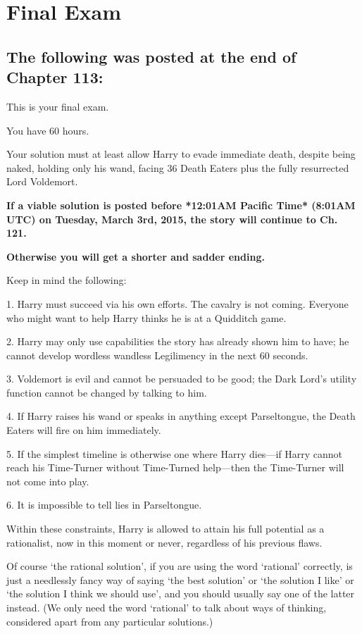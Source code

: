 \chapter{Final Exam}

\section{The following was posted at the end of Chapter 113:}

{\setlength{\parindent}{0pt}
\setlength{\parskip}{.5\baselineskip}

This is your final exam.

You have 60 hours.

Your solution must at least allow Harry to evade immediate death,
despite being naked, holding only his wand, facing 36 Death Eaters
plus the fully resurrected Lord Voldemort.

\textbf{If a viable solution is posted before
*12:01AM Pacific Time* (8:01AM UTC) on Tuesday, March 3rd, 2015,
the story will continue to Ch. 121.}

\textbf{Otherwise you will get a shorter and sadder ending.}

Keep in mind the following:

1. Harry must succeed via his own efforts. The cavalry is not coming.
Everyone who might want to help Harry thinks he is at a Quidditch game.

2. Harry may only use capabilities the story has already shown him to
have;
he cannot develop wordless wandless Legilimency in the next 60 seconds.

3. Voldemort is evil and cannot be persuaded to be good;
the Dark Lord's utility function cannot be changed by talking to him.

4. If Harry raises his wand or speaks in anything except Parseltongue,
the Death Eaters will fire on him immediately.

5. If the simplest timeline is otherwise one where Harry dies---if 
Harry cannot reach his Time-Turner without Time-Turned help---then 
the Time-Turner will not come into play.

6. It is impossible to tell lies in Parseltongue.

Within these constraints,
Harry is allowed to attain his full potential as a rationalist,
now in this moment or never,
regardless of his previous flaws.

Of course `the rational solution',
if you are using the word `rational' correctly,
is just a needlessly fancy way of saying `the best solution'
or `the solution I like' or `the solution I think we should use',
and you should usually say one of the latter instead.
(We only need the word `rational' to talk about ways of thinking,
considered apart from any particular solutions.)

}
